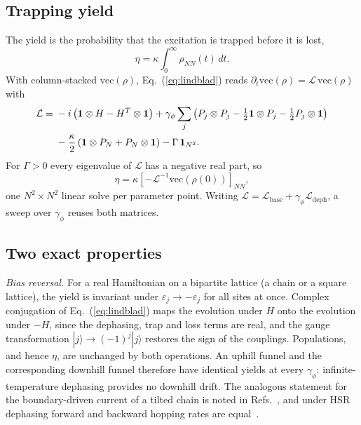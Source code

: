 \documentclass[aps,pre,preprint,floatfix]{revtex4-2}
\newcommand{\gp}{\gamma_\phi}
\newcommand{\Lop}{\mathcal{L}}
\newcommand{\ket}[1]{|#1\rangle}
\newcommand{\half}{\tfrac{1}{2}}
\begin{document}
\subsection{Trapping yield}

The yield is the probability that the excitation is trapped before it is lost,
\begin{equation}
  \eta = \kappa\int_0^\infty \rho_{NN}(t)\,dt .
  \label{eq:yield_def}
\end{equation}
With column-stacked $\mathrm{vec}(\rho)$, Eq.~(\ref{eq:lindblad}) reads
$\partial_t\mathrm{vec}(\rho)=\Lop\,\mathrm{vec}(\rho)$ with
\begin{align}
  \Lop =\;& -i\left(\mathbf{1}\otimes H - H^{T}\otimes\mathbf{1}\right)
    + \gp\sum_j\left(P_j\otimes P_j - \half\mathbf{1}\otimes P_j
      - \half P_j\otimes\mathbf{1}\right) \notag\\
    & - \frac{\kappa}{2}\left(\mathbf{1}\otimes P_N + P_N\otimes\mathbf{1}\right)
      - \Gamma\,\mathbf{1}_{N^2}.
  \label{eq:liouvillian}
\end{align}
For $\Gamma>0$ every eigenvalue of $\Lop$ has a negative real part, so
\begin{equation}
  \eta = \kappa\left[-\Lop^{-1}\mathrm{vec}(\rho(0))\right]_{NN},
  \label{eq:yield_solve}
\end{equation}
one $N^2\times N^2$ linear solve per parameter point.
Writing $\Lop=\Lop_\text{base}+\gp\Lop_\text{deph}$, a sweep over $\gp$
reuses both matrices.

\subsection{\label{sec:symmetry}Two exact properties}

\textit{Bias reversal.}
For a real Hamiltonian on a bipartite lattice (a chain or a square lattice),
the yield is invariant under $\varepsilon_j\to-\varepsilon_j$ for all sites at
once.
Complex conjugation of Eq.~(\ref{eq:lindblad}) maps the evolution under $H$
onto the evolution under $-H$, since the dephasing, trap and loss terms are
real, and the gauge transformation $\ket{j}\to(-1)^j\ket{j}$ restores the sign
of the couplings.
Populations, and hence $\eta$, are unchanged by both operations.
An uphill funnel and the corresponding downhill funnel therefore have
identical yields at every $\gp$: infinite-temperature dephasing provides no
downhill drift.
The analogous statement for the boundary-driven current of a tilted chain is
noted in Refs.~\cite{jacob2024,mendozaarenas2024}, and under HSR dephasing
forward and backward hopping rates are equal~\cite{moix2013}.
\end{document}
